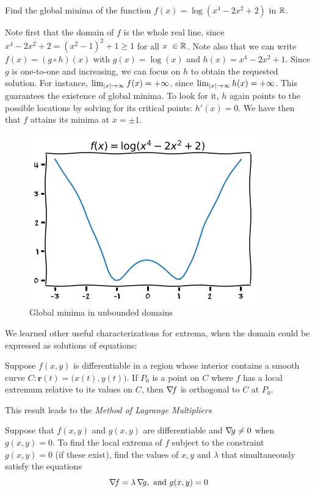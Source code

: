 \begin{example}
Find the global minima of the function $f(x)= \log (x^4-2x^2+2)$ in $\mathbb{R}$.  

Note first that the domain of $f$ is the whole real line, since $x^4-2x^2+2 = (x^2-1)^2+1 \geq 1$ for all $x\ \in \mathbb{R}$.  Note also that we can write $f(x) = (g \circ h)(x)$ with $g(x) = \log(x)$ and $h(x)=x^4-2x^2+1$.  Since $g$ is one-to-one and increasing, we can focus on $h$ to obtain the requested solution.  For instance, $\lim_{\lvert x \rvert\to\infty}f(x) = +\infty$, since $\lim_{\lvert x \rvert\to\infty} h(x) = +\infty$. This guarantees the existence of global minima.  To look for it, $h$ again points to the possible locations by solving for its critical points: $h'(x)=0$.  We have then that $f$ attains its minima at $x=\pm 1$.
\begin{figure}[ht!]
\begin{center}
\includegraphics[width=0.5\linewidth]{coercivelog.png}
\end{center}
\caption{Global minima in unbounded domains}
\label{figure:coercivelog}
\end{figure}
\end{example}

We learned other useful characterizations for extrema, when the domain could be expressed as solutions of equations:

\begin{theorem}\label{theorem:OrthogonalGradient}
Suppose $f(x,y)$ is differentiable in a region whose interior contains a smooth curve $C\colon \boldsymbol{r}(t) = \big( x(t), y(t) \big)$.  If $P_0$ is a point on $C$ where $f$ has a local extremum relative to its values on $C$, then $\mathop{\nabla\! {f}}$ is orthogonal to $C$ at $P_0$.
\end{theorem}

This result leads to the \emph{Method of Lagrange Multipliers}

\begin{theorem}\label{theorem:LM1C}
Suppose that $f(x,y)$ and $g(x,y)$ are differentiable and $\mathop{\nabla\! {g}} \neq 0$ when $g(x,y)=0$.  To find the local extrema of $f$ subject to the constraint $g(x,y)=0$ (if these exist), find the values of $x,y$ and $\lambda$ that simultaneously satisfy the equations
\begin{equation*}
\mathop{\nabla\! {f}} = \lambda \mathop{\nabla\! {g}}, \text{ and }g(x,y)=0
\end{equation*}
\end{theorem}

